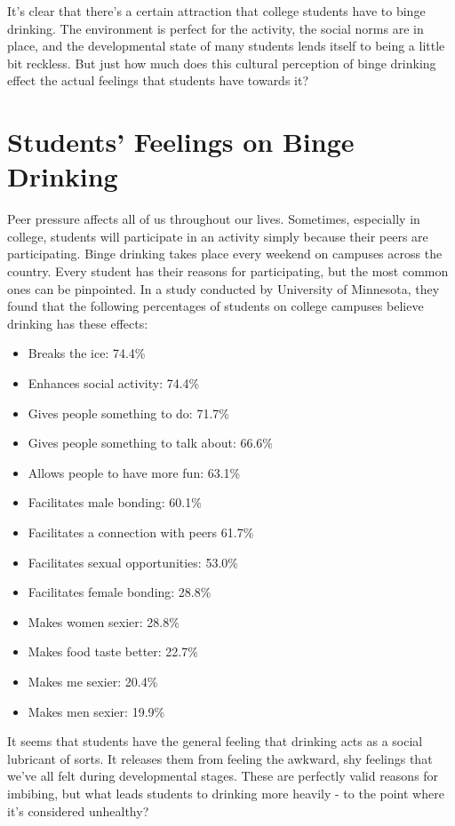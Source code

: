 \documentclass[12pt, doc]{apa6}
\begin{document}
It's clear that there's a certain attraction that college students have to binge drinking. The environment is perfect for the activity, the social norms are in place, and the developmental state of many students lends itself to being a little bit reckless. But just how much does this cultural perception of binge drinking effect the actual feelings that students have towards it?

\section{Students' Feelings on Binge Drinking}
Peer pressure affects all of us throughout our lives. Sometimes, especially in college, students will participate in an activity simply because their peers are participating. Binge drinking takes place every weekend on campuses across the country. Every student has their reasons for participating, but the most common ones can be pinpointed. In a study conducted by University of Minnesota, they found that the following percentages of students on college campuses believe drinking has these effects:
\begin{itemize}
	\item Breaks the ice: 74.4\%
	\item Enhances social activity: 74.4\%
	\item Gives people something to do: 71.7\%
	\item Gives people something to talk about: 66.6\%
	\item Allows people to have more fun: 63.1\%
	\item Facilitates male bonding: 60.1\%
	\item Facilitates a connection with peers 61.7\%
	\item Facilitates sexual opportunities: 53.0\%
	\item Facilitates female bonding: 28.8\%
	\item Makes women sexier: 28.8\%
	\item Makes food taste better: 22.7\%
	\item Makes me sexier: 20.4\%
	\item Makes men sexier: 19.9\%
\end{itemize}

It seems that students have the general feeling that drinking acts as a social lubricant of sorts. It releases them from feeling the awkward, shy feelings that we've all felt during developmental stages. These are perfectly valid reasons for imbibing, but what leads students to drinking more heavily - to the point where it's considered unhealthy?
\end{document}
